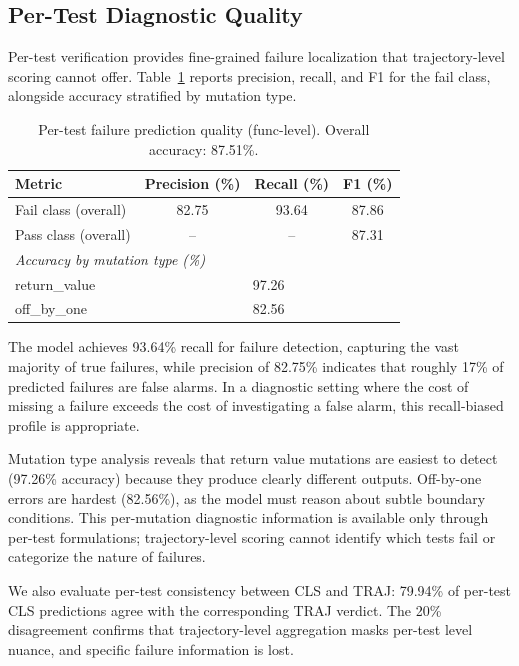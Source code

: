 \documentclass[11pt,a4paper]{article}
\begin{document}
\subsection{Per-Test Diagnostic Quality}
\label{sec:diag}

Per-test verification provides fine-grained failure localization that trajectory-level scoring cannot offer. Table~\ref{tab:diag} reports precision, recall, and F1 for the fail class, alongside accuracy stratified by mutation type.

\begin{table}[t]
\centering
\caption{Per-test failure prediction quality (func-level). Overall accuracy: 87.51\%.}
\label{tab:diag}
\small
\begin{tabular}{lccc}
\toprule
Metric & Precision (\%) & Recall (\%) & F1 (\%) \\
\midrule
Fail class (overall) & 82.75 & 93.64 & 87.86 \\
Pass class (overall) & -- & -- & 87.31 \\
\midrule
\multicolumn{4}{l}{\textit{Accuracy by mutation type (\%)}} \\
\quad return\_value & \multicolumn{3}{c}{97.26} \\
\quad off\_by\_one & \multicolumn{3}{c}{82.56} \\
\bottomrule
\end{tabular}
\end{table}

The model achieves 93.64\% recall for failure detection, capturing the vast majority of true failures, while precision of 82.75\% indicates that roughly 17\% of predicted failures are false alarms. In a diagnostic setting where the cost of missing a failure exceeds the cost of investigating a false alarm, this recall-biased profile is appropriate.

Mutation type analysis reveals that return value mutations are easiest to detect (97.26\% accuracy) because they produce clearly different outputs. Off-by-one errors are hardest (82.56\%), as the model must reason about subtle boundary conditions. This per-mutation diagnostic information is available only through per-test formulations; trajectory-level scoring cannot identify which tests fail or categorize the nature of failures.

We also evaluate per-test consistency between CLS and TRAJ: 79.94\% of per-test CLS predictions agree with the corresponding TRAJ verdict. The 20\% disagreement confirms that trajectory-level aggregation masks per-test level nuance, and specific failure information is lost.
\end{document}
